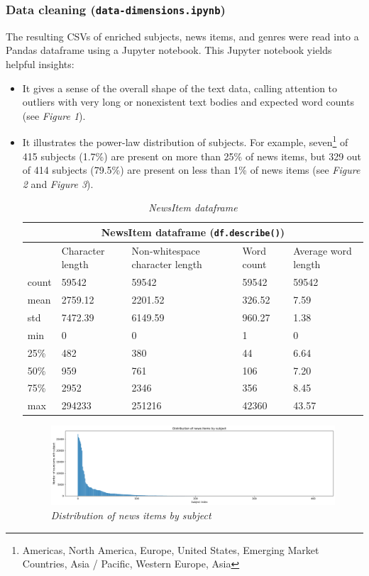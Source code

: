 \documentclass[11pt]{article}
\begin{document}
  \subsubsection{Data cleaning (\lstinline{data-dimensions.ipynb})}
  The resulting CSVs of enriched subjects, news items, and genres were read into a Pandas dataframe using a Jupyter notebook. This Jupyter notebook yields helpful insights:
  \begin{itemize}
    \item{It gives a sense of the overall shape of the text data, calling attention to outliers with very long or nonexistent text bodies and expected word counts (see \textit{Figure 1}).}

    \item{It illustrates the power-law distribution of subjects. For example, seven\footnote{Americas, North America, Europe, United States, Emerging Market Countries, Asia / Pacific, Western Europe, Asia} of 415 subjects (1.7\%) are present on more than 25\% of news items, but 329 out of 414 subjects (79.5\%) are present on less than 1\% of news items (see \textit{Figure 2} and \textit{Figure 3}).

    \begin{table}
      \begin{tabular}{ |p{1cm}|p{2.25cm}|p{2.25cm}|p{2.25cm}|p{2.25cm}|  }
      \hline
      \multicolumn{5}{|c|}{NewsItem dataframe (\lstinline{df.describe()})} \\
      \hline
      &Character length&Non-whitespace character length&Word count&Average word length\\
      \hline
      count&59542&59542&59542&59542\\
      mean&2759.12&2201.52&326.52&7.59\\
      std&7472.39&6149.59&960.27&1.38\\
      min&0&0&1&0\\
      25\%&482&380&44&6.64\\
      50\%&959&761&106&7.20\\
      75\%&2952&2346&356&8.45\\
      max&294233&251216&42360&43.57\\
      \hline
      \end{tabular}
      \caption{\textit{NewsItem dataframe}}
    \end{table}

    \begin{figure}
      \centerline{\includegraphics[scale=0.35]{distribution_news_item_subject}}
      \caption{\textit{Distribution of news items by subject}}
    \end{figure}

}
\end{itemize}
\end{document}
